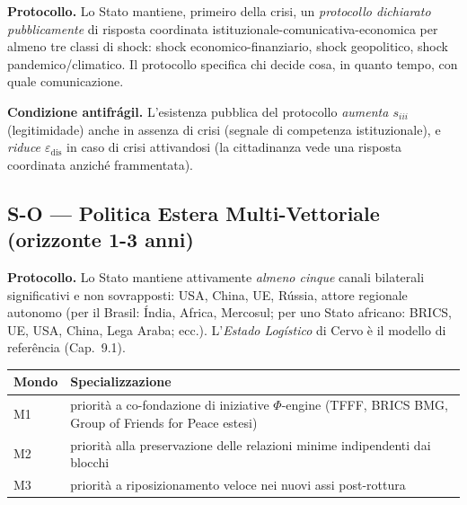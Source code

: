 \Hypoth{} \textbf{Protocollo.} Lo Stato mantiene, primeiro della crisi, un
\emph{protocollo dichiarato pubblicamente} di risposta coordinata
istituzionale-comunicativa-economica per almeno tre classi di shock:
shock economico-finanziario, shock geopolitico, shock
pandemico/climatico. Il protocollo specifica chi decide cosa, in quanto
tempo, con quale comunicazione.

\Proved{} \textbf{Condizione antifrágil.} L'esistenza pubblica del
protocollo \emph{aumenta \(s_{iii}\)} (legitimidade) anche in assenza di
crisi (segnale di competenza istituzionale), e \emph{riduce
\(\varepsilon_{\text{dis}}\)} in caso di crisi attivandosi (la
cittadinanza vede una risposta coordinata anziché frammentata).

\subsection{S-O --- Politica Estera Multi-Vettoriale (orizzonte 1-3
anni)}\label{s-o-politica-estera-multi-vettoriale-orizzonte-1-3-anni}

\Hypoth{} \textbf{Protocollo.} Lo Stato mantiene attivamente
\emph{almeno cinque} canali bilaterali significativi e non sovrapposti:
USA, China, UE, Rússia, attore regionale autonomo (per il Brasil: Índia,
Africa, Mercosul; per uno Stato africano: BRICS, UE, USA, China, Lega
Araba; ecc.). L'\emph{Estado Logístico} di Cervo è il modello di
referência (Cap.~9.1).

{\def\LTcaptype{none} %
{\small\begin{longtable}[]{@{}
  >{\raggedright\arraybackslash}p{}
  >{\raggedright\arraybackslash}p{}@{}}
\toprule\noalign{}
\begin{minipage}[b]{\linewidth}\raggedright
Mondo
\end{minipage} & \begin{minipage}[b]{\linewidth}\raggedright
Specializzazione
\end{minipage} \\
\midrule\noalign{}
\endhead
\bottomrule\noalign{}
\endlastfoot
M1 & priorità a co-fondazione di iniziative \(\Phi\)-engine (TFFF, BRICS
BMG, Group of Friends for Peace estesi) \\
M2 & priorità alla preservazione delle relazioni minime indipendenti dai
blocchi \\
M3 & priorità a riposizionamento veloce nei nuovi assi post-rottura \\
\end{longtable}}
}

